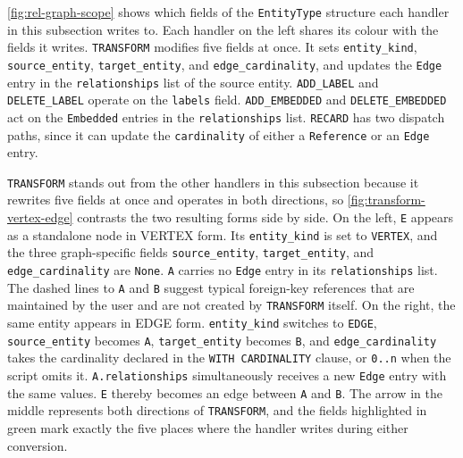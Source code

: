   \autoref{fig:rel-graph-scope} shows which fields of the
  \texttt{EntityType} structure each handler in this subsection writes
  to. Each handler on the left shares its colour with the fields it
  writes. \texttt{TRANSFORM} modifies five fields at once. It sets
  \texttt{entity\_kind}, \texttt{source\_entity}, \texttt{target\_entity},
  and \texttt{edge\_cardinality}, and updates the \texttt{Edge} entry in
  the \texttt{relationships} list of the source entity.
  \texttt{ADD\_LABEL} and \texttt{DELETE\_LABEL} operate on the
  \texttt{labels} field. \texttt{ADD\_EMBEDDED} and
  \texttt{DELETE\_EMBEDDED} act on the \texttt{Embedded} entries in the
  \texttt{relationships} list. \texttt{RECARD} has two dispatch paths,
  since it can update the \texttt{cardinality} of either a
  \texttt{Reference} or an \texttt{Edge} entry.

  \texttt{TRANSFORM} stands out from the other handlers in this
  subsection because it rewrites five fields at once and operates in
  both directions, so \autoref{fig:transform-vertex-edge} contrasts the
  two resulting forms side by side. On the left, \texttt{E} appears as
  a standalone node in VERTEX form. Its \texttt{entity\_kind} is set to
  \texttt{VERTEX}, and the three graph-specific fields
  \texttt{source\_entity}, \texttt{target\_entity}, and
  \texttt{edge\_cardinality} are \texttt{None}. \texttt{A} carries no
  \texttt{Edge} entry in its \texttt{relationships} list. The dashed
  lines to \texttt{A} and \texttt{B} suggest typical foreign-key
  references that are maintained by the user and are not created by
  \texttt{TRANSFORM} itself. On the right, the same entity appears in
  EDGE form. \texttt{entity\_kind} switches to \texttt{EDGE},
  \texttt{source\_entity} becomes \texttt{A}, \texttt{target\_entity}
  becomes \texttt{B}, and \texttt{edge\_cardinality} takes the
  cardinality declared in the \texttt{WITH CARDINALITY} clause, or
  \texttt{0..n} when the script omits it. \texttt{A.relationships} simultaneously receives a new \texttt{Edge} entry with the same values. \texttt{E} thereby becomes an edge between \texttt{A}
  and \texttt{B}. The arrow in the middle represents both
  directions of \texttt{TRANSFORM}, and the fields highlighted in green
  mark exactly the five places where the handler writes during either
  conversion.


